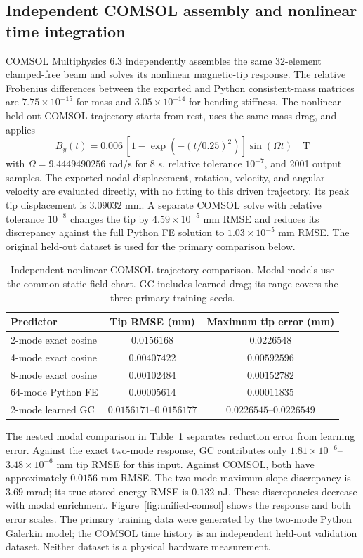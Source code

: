 \subsection{Independent COMSOL assembly and nonlinear time integration}
\label{sec:unified-comsol}
COMSOL Multiphysics 6.3 independently assembles the same 32-element
clamped-free beam and solves its nonlinear magnetic-tip response.
The relative Frobenius differences between the exported and Python
consistent-mass matrices are $7.75\times10^{-15}$ for mass and
$3.05\times10^{-14}$ for bending stiffness.
The nonlinear held-out COMSOL trajectory starts from rest, uses the
same mass drag, and applies
\begin{equation}
 B_y(t)=0.006\,[1-\exp(-(t/0.25)^2)]\sin(\Omega t)\quad\mathrm{T}
\end{equation}
with $\Omega=9.4449490256$ rad/s for 8 s, relative tolerance $10^{-7}$,
and 2001 output samples.
The exported nodal displacement, rotation, velocity, and angular velocity
are evaluated directly, with no fitting to this driven trajectory.
Its peak tip displacement is $3.09032$ mm.
A separate COMSOL solve with relative tolerance $10^{-8}$ changes the
tip by $4.59\times10^{-5}$ mm RMSE and reduces its discrepancy against
the full Python FE solution to $1.03\times10^{-5}$ mm RMSE. The original
held-out dataset is used for the primary comparison below.

\begin{table}[t]
\centering
\caption{Independent nonlinear COMSOL trajectory comparison. Modal models
use the common static-field chart. GC includes learned drag; its range
covers the three primary training seeds.}
\label{tab:unified-comsol}
\small
\begin{tabular}{lcc}
\hline
Predictor & Tip RMSE (mm) & Maximum tip error (mm)\\
\hline
2-mode exact cosine & $0.0156168$ & $0.0226548$\\
4-mode exact cosine & $0.00407422$ & $0.00592596$\\
8-mode exact cosine & $0.00102484$ & $0.00152782$\\
64-mode Python FE & $0.00005614$ & $0.00011835$\\
2-mode learned GC & $0.0156171$--$0.0156177$ & $0.0226545$--$0.0226549$\\
\hline
\end{tabular}
\end{table}

The nested modal comparison in Table~\ref{tab:unified-comsol} separates
reduction error from learning error. Against the exact two-mode response,
GC contributes only $1.81\times10^{-6}$--$3.48\times10^{-6}$ mm tip RMSE
for this input. Against COMSOL, both have approximately $0.0156$ mm RMSE.
The two-mode maximum slope discrepancy is $3.69$ mrad; its true stored-energy
RMSE is $0.132$ nJ. These discrepancies decrease with modal enrichment.
Figure~\ref{fig:unified-comsol} shows the response and both error scales.
The primary training data were generated by the two-mode Python
Galerkin model; the COMSOL time history is an independent held-out
validation dataset. Neither dataset is a physical hardware measurement.

